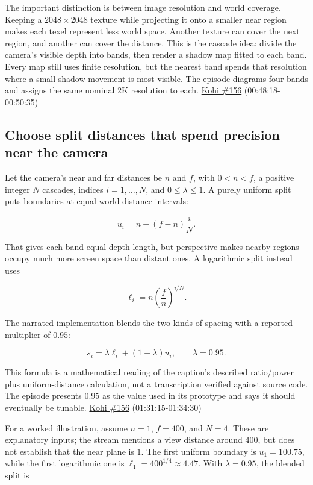 The important distinction is between image resolution and world coverage. Keeping a \(2048\times2048\) texture while projecting it onto a smaller near region makes each texel represent less world space. Another texture can cover the next region, and another can cover the distance. This is the cascade idea: divide the camera's visible depth into bands, then render a shadow map fitted to each band. Every map still uses finite resolution, but the nearest band spends that resolution where a small shadow movement is most visible. The episode diagrams four bands and assigns the same nominal 2K resolution to each. \href{https://www.youtube.com/watch?v=coWS_saBPBk}{Kohi \#156} (00:48:18-00:50:35)

\subsection{Choose split distances that spend precision near the camera}\label{06-engine-ii-ch026-choose-split-distances-that-spend-precision-near-the-camera}

\hypertarget{06-engine-ii-ch026-choose-split-distances-that-spend-precision-near-the-camera}{}

Let the camera's near and far distances be \(n\) and \(f\), with \(0<n<f\), a positive integer \(N\) cascades, indices \(i=1,\ldots,N\), and \(0\leq\lambda\leq1\). A purely uniform split puts boundaries at equal world-distance intervals:

\[u_i=n+(f-n)\frac{i}{N}.\]

That gives each band equal depth length, but perspective makes nearby regions occupy much more screen space than distant ones. A logarithmic split instead uses

\[\ell_i=n\left(\frac{f}{n}\right)^{i/N}.\]

The narrated implementation blends the two kinds of spacing with a reported multiplier of \(0.95\):

\[s_i=\lambda\ell_i+(1-\lambda)u_i,\qquad \lambda=0.95.\]

This formula is a mathematical reading of the caption's described ratio/power plus uniform-distance calculation, not a transcription verified against source code. The episode presents \(0.95\) as the value used in its prototype and says it should eventually be tunable. \href{https://www.youtube.com/watch?v=coWS_saBPBk}{Kohi \#156} (01:31:15-01:34:30)

For a worked illustration, assume \(n=1\), \(f=400\), and \(N=4\). These are explanatory inputs; the stream mentions a view distance around \(400\), but does not establish that the near plane is \(1\). The first uniform boundary is \(u_1=100.75\), while the first logarithmic one is \(\ell_1=400^{1/4}\approx4.47\). With \(\lambda=0.95\), the blended split is

